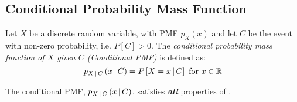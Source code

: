 \subsection{Conditional Probability Mass Function}\label{subsec:Conditional Probability Mass Function}
\begin{definition}\label{def:Conditional Probability Mass Function}
  Let $X$ be a discrete random variable, with PMF $p_{X} \left( x \right)$ and let $C$ be the event with non-zero probability, i.e. $P \left[ C \right] > 0$.
  The \emph{conditional probability mass function of $X$ given $C$ (Conditional PMF)} is defined as:
  \begin{equation}\label{eq:Conditional Probability Mass Function}
    p_{X \operatorname{\vert} C} \left( x \operatorname{\vert} C \right) = P \left[ X=x \operatorname{\vert} C \right] \text{ for } x \in \operatorname{\mathbb{R}}
  \end{equation}
  \begin{remark}\label{rmk:Properties of Conditional Probability Mass Functions}
    The conditional PMF, $p_{X \operatorname{\vert} C} \left( x \operatorname{\vert} C \right)$, satisfies \emph{\textbf{all}} properties of .
  \end{remark}
\end{definition}

